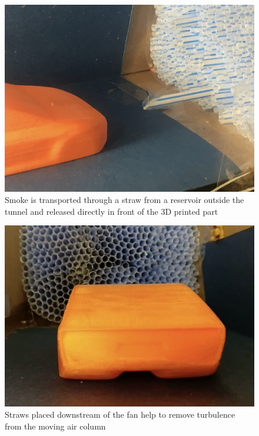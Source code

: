 \documentclass[12pt]{article}
\begin{document}
\begin{figure}[h!]
	\centering
	\includegraphics[width=.7\textwidth]{./images/setup2.jpg}
    \captionsetup{justification=centering,margin=2cm}
	\caption{Smoke is transported through a straw from a reservoir outside the tunnel and released directly in front of the 3D printed part}
	\label{fig:setup2}
\end{figure}

\begin{figure}[h!]
	\centering
	\includegraphics[width=.7\textwidth]{./images/setup3.jpg}
    \captionsetup{justification=centering,margin=2cm}
	\caption{Straws placed downstream of the fan help to remove turbulence from the moving air column}
	\label{fig:setup3}
\end{figure}
\end{document}
